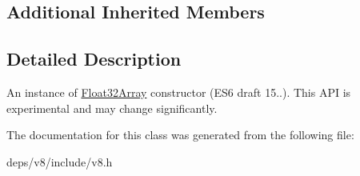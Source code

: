 \subsection*{Additional Inherited Members}


\subsection{Detailed Description}
An instance of \hyperlink{classv8_1_1_float32_array}{Float32\+Array} constructor (E\+S6 draft 15..). This A\+P\+I is experimental and may change significantly. 

The documentation for this class was generated from the following file\+:\begin{DoxyCompactItemize}
\item 
deps/v8/include/v8.\+h\end{DoxyCompactItemize}
